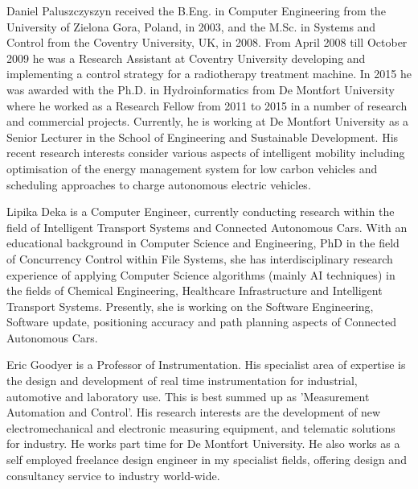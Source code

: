 \documentclass[journal]{IEEEtran}
\begin{document}
\begin{IEEEbiographynophoto}{Daniel Paluszczyszyn}
received the B.Eng. in Computer Engineering from the University of Zielona Gora, Poland, in 2003, and the M.Sc. in Systems and Control from the Coventry University, UK, in 2008.
From April 2008 till October 2009 he was a Research Assistant at Coventry University developing and implementing a control strategy for a radiotherapy treatment machine. In 2015 he was awarded with the Ph.D. in Hydroinformatics from De Montfort University where he worked as a Research Fellow from 2011 to 2015 in a number of research and commercial projects. Currently, he is working at De Montfort University as a Senior Lecturer in the School of Engineering and Sustainable Development. His recent research interests consider various aspects of intelligent mobility including optimisation of the energy management system for low carbon vehicles and scheduling approaches to charge autonomous electric vehicles.
\end{IEEEbiographynophoto}

\begin{IEEEbiographynophoto}{Lipika Deka}
is a Computer Engineer, currently conducting research within the field of Intelligent Transport Systems and Connected Autonomous Cars. With an educational background in Computer Science and Engineering, PhD in the field of Concurrency Control within File Systems, she has interdisciplinary research experience of applying Computer Science algorithms (mainly AI techniques) in the fields of Chemical Engineering, Healthcare Infrastructure and Intelligent Transport Systems. Presently, she is working on the Software Engineering, Software update, positioning accuracy and path planning aspects of Connected Autonomous Cars.
\end{IEEEbiographynophoto}

\begin{IEEEbiographynophoto}{Eric Goodyer}
is a Professor of Instrumentation. His specialist area of expertise is the design and development of real time instrumentation for industrial, automotive and laboratory use. This is best summed up as ’Measurement Automation and Control’. His research interests are the development of new electromechanical and electronic measuring equipment, and telematic solutions for industry. He works part time for De Montfort University. He also works as a self employed freelance design engineer in my specialist fields, offering design and consultancy service to industry world-wide.
\end{IEEEbiographynophoto}




\end{document}
